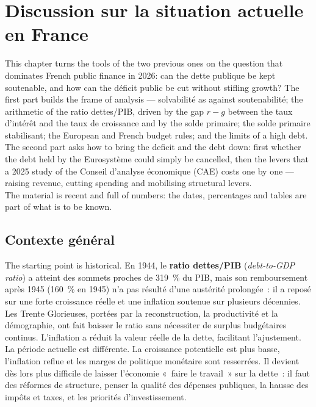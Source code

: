 \section{Discussion sur la situation actuelle en France}

This chapter turns the tools of the two previous ones on the question that
dominates French public finance in 2026: can the dette publique be kept
soutenable, and how can the déficit public be cut without stifling growth? The
first part builds the frame of analysis --- solvabilité as against
soutenabilité; the arithmetic of the ratio dettes/PIB, driven by the gap
$r - g$ between the taux d'intérêt and the taux de croissance and by the solde
primaire; the solde primaire stabilisant; the European and French budget
rules; and the limits of a high debt. The second part asks how to bring
the deficit and the debt down: first whether the debt held by the Eurosystème could simply be cancelled, then
the levers that a 2025 study of the Conseil d'analyse économique (CAE) costs one
by one --- raising revenue, cutting spending and mobilising structural levers.\\

The material is recent and full of numbers: the dates, percentages and tables
are part of what is to be known.

\subsection{Contexte général}

The starting point is historical. En 1944, le \textbf{ratio dettes/PIB}
(\textit{debt-to-GDP ratio}) a atteint des sommets proches de 319~\% du PIB,
mais son remboursement après 1945 (160~\% en 1945) n'a pas résulté d'une
austérité prolongée~: il a reposé sur une forte croissance réelle et une
inflation soutenue sur plusieurs décennies. Les Trente Glorieuses, portées par
la reconstruction, la productivité et la démographie, ont fait baisser le ratio
sans nécessiter de surplus budgétaires continus. L'inflation a réduit la valeur
réelle de la dette, facilitant l'ajustement.\\

La période actuelle est différente. La croissance potentielle est plus basse,
l'inflation reflue et les marges de politique monétaire sont resserrées. Il
devient dès lors plus difficile de laisser l'économie «~faire le travail~» sur
la dette~: il faut des réformes de structure, penser la qualité des dépenses
publiques, la hausse des impôts et taxes, et les priorités d'investissement.\\

